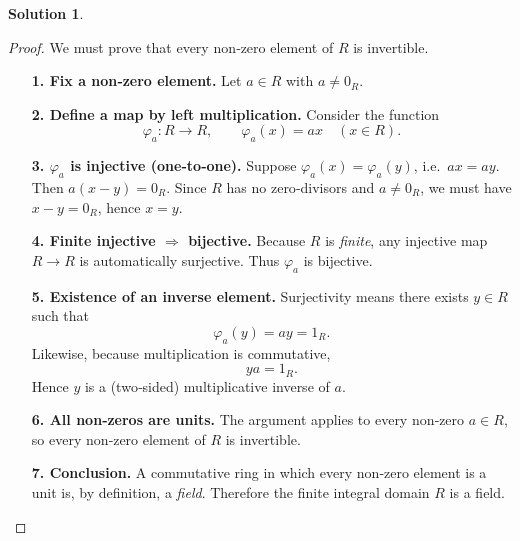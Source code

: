 \documentclass[12pt]{article}
\theoremstyle{definition} %
\newtheorem{solution}{Solution}
\theoremstyle{plain} %
\begin{document}
\begin{solution}


\begin{proof}
  We must prove that every non‑zero element of $R$ is invertible.
  \begin{enumerate}
      \item[\textbf{1.  Fix a non‑zero element.}]
            Let $a\in R$ with $a\neq 0_R$.

      \item[\textbf{2.  Define a map by left multiplication.}]
            Consider the function
            \[
                \varphi_a : R \longrightarrow R,
                \qquad
                \varphi_a(x)=ax \quad (x\in R).
            \]

      \item[\textbf{3.  $\varphi_a$ is injective (one‑to‑one).}]
            Suppose $\varphi_a(x)=\varphi_a(y)$, i.e.\ $ax=ay$.
            Then $a(x-y)=0_R$.
            Since $R$ has no zero‑divisors and $a\neq 0_R$,
            we must have $x-y=0_R$, hence $x=y$.

      \item[\textbf{4.  Finite injective $\Longrightarrow$ bijective.}]
            Because $R$ is \emph{finite}, any injective map
            $R\to R$ is automatically surjective.
            Thus $\varphi_a$ is bijective.

      \item[\textbf{5.  Existence of an inverse element.}]
            Surjectivity means there exists $y\in R$ such that
            \[
                \varphi_a(y)=ay = 1_R .
            \]
            Likewise, because multiplication is commutative,
            \[
                ya = 1_R .
            \]
            Hence $y$ is a (two‑sided) multiplicative inverse of $a$.

      \item[\textbf{6.  All non‑zeros are units.}]
            The argument applies to every non‑zero $a\in R$,
            so every non‑zero element of $R$ is invertible.

      \item[\textbf{7.  Conclusion.}]
            A commutative ring in which every non‑zero element is a unit
            is, by definition, a \emph{field}.
            Therefore the finite integral domain $R$ is a field.
  \end{enumerate}
\end{proof} 
\end{solution}
\end{document}
